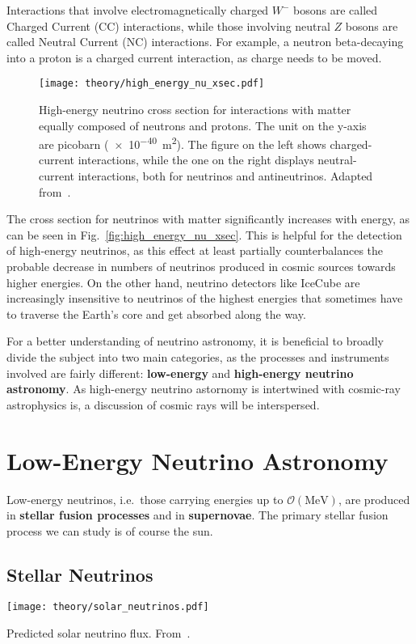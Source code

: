 Interactions that involve electromagnetically charged $W^-$ bosons are called Charged Current (CC) interactions, while those involving neutral $Z$ bosons are called Neutral Current (NC) interactions. For example, a neutron beta-decaying into a proton is a charged current interaction, as charge needs to be moved.

\begin{figure}[htb]
    \texttt{[image: theory/high\_energy\_nu\_xsec.pdf]}
    \caption[High-energy neutrino cross section]{High-energy neutrino cross section for interactions with matter equally composed of neutrons and protons. The unit on the y-axis are picobarn (\SI{e-40}{\m\squared}). The figure on the left shows charged-current interactions, while the one on the right displays neutral-current interactions, both for neutrinos and antineutrinos. Adapted from~\cite{CooperSarkar2011}.}
\end{figure}

The cross section for neutrinos with matter significantly increases with energy, as can be seen in Fig.~\ref{fig:high_energy_nu_xsec}. This is helpful for the detection of high-energy neutrinos, as this effect at least partially counterbalances the probable decrease in numbers of neutrinos produced in cosmic sources towards higher energies. On the other hand, neutrino detectors like IceCube are increasingly insensitive to neutrinos of the highest energies that sometimes have to traverse the Earth's core and get absorbed along the way.

For a better understanding of neutrino astronomy, it is beneficial to broadly divide the subject into two main categories, as the processes and instruments involved are fairly different: \textbf{low-energy} and \textbf{high-energy neutrino astronomy}. As high-energy neutrino astornomy is intertwined with cosmic-ray astrophysics is, a discussion of cosmic rays will be interspersed.

\section{Low-Energy Neutrino Astronomy}
Low-energy neutrinos, i.e.\ those carrying energies up to $\mathcal{O}(\unit{\mega\eV})$, are produced in \textbf{stellar fusion processes} and in \textbf{supernovae}. The primary stellar fusion process we can study is of course the sun.

\subsection{Stellar Neutrinos}
\begin{marginfigure}
    \texttt{[image: theory/solar\_neutrinos.pdf]}
    \caption[Predicted solar neutrino flux]{Predicted solar neutrino flux. From~\cite{Agostini2018}.}
\end{marginfigure}

